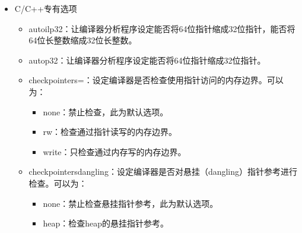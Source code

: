 \documentclass[a4paper,12pt,english]{sphinxmanual}
\begin{document}
\begin{itemize}
\begin{itemize}
\item {} 
\sphinxAtStartPar
\sphinxhyphen{}mlong\sphinxhyphen{}double\sphinxhyphen{}：覆盖掉默认的长双精度数据类型配置。可以为：
\begin{itemize}
\item {} 
：设定长双精度数据为64位。

\item {} 
：设定长双精度数据为80位。

\end{itemize}

\end{itemize}

\item {} 
\sphinxAtStartPar
C/C++专有选项
\begin{itemize}
\item {} 
\sphinxAtStartPar
\sphinxhyphen{}auto\sphinxhyphen{}ilp32：让编译器分析程序设定能否将64位指针缩成32位指针，能否将64位长整数缩成32位长整数。

\item {} 
\sphinxAtStartPar
\sphinxhyphen{}auto\sphinxhyphen{}p32：让编译器分析程序设定能否将64位指针缩成32位指针。

\item {} 
\sphinxAtStartPar
\sphinxhyphen{}check\sphinxhyphen{}pointers=：设定编译器是否检查使用指针访问的内存边界。可以为：
\begin{itemize}
\item {} 
\sphinxAtStartPar
none：禁止检查，此为默认选项。

\item {} 
\sphinxAtStartPar
rw：检查通过指针读写的内存边界。

\item {} 
\sphinxAtStartPar
write：只检查通过内存写的内存边界。

\end{itemize}

\item {} 
\sphinxAtStartPar
\sphinxhyphen{}check\sphinxhyphen{}pointers\sphinxhyphen{}dangling：设定编译器是否对悬挂（dangling）指针参考进行检查。可以为：
\begin{itemize}
\item {} 
\sphinxAtStartPar
none：禁止检查悬挂指针参考，此为默认选项。

\item {} 
\sphinxAtStartPar
heap：检查heap的悬挂指针参考。


\end{itemize}
\end{itemize}
\end{itemize}
\end{document}
